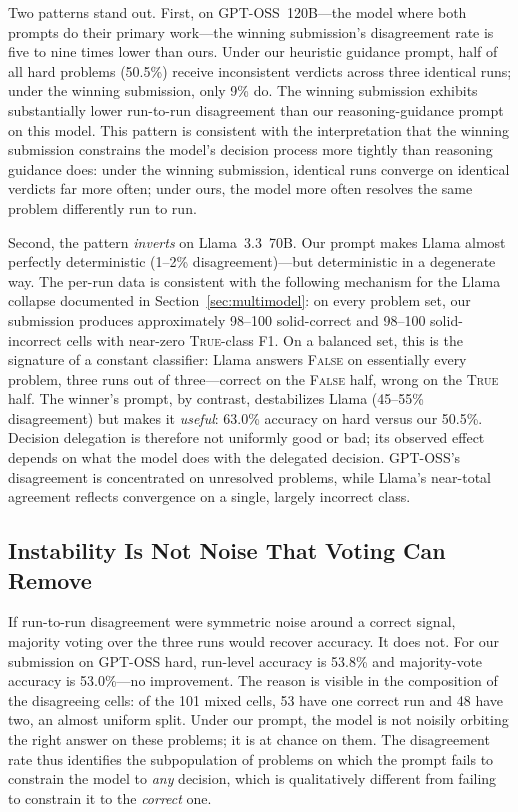 \documentclass[11pt]{article}
\begin{document}
Two patterns stand out. First, on GPT-OSS~120B---the model where both
prompts do their primary work---the winning submission's disagreement
rate is five to nine times lower than ours. Under our heuristic
guidance prompt, half of all hard problems (50.5\%) receive
inconsistent verdicts across three identical runs; under the winning
submission, only 9\% do. The winning submission exhibits
substantially lower run-to-run disagreement than our
reasoning-guidance prompt on this model. This pattern is consistent
with the interpretation that the winning submission constrains the
model's decision process more tightly than reasoning guidance does:
under the winning submission, identical runs converge on identical
verdicts far more often; under ours, the model more often resolves
the same problem differently run to run.

Second, the pattern \emph{inverts} on Llama~3.3~70B. Our prompt makes
Llama almost perfectly deterministic (1--2\% disagreement)---but
deterministic in a degenerate way. The per-run data is consistent with the following
mechanism for the Llama collapse documented in
Section~\ref{sec:multimodel}: on every problem set, our submission
produces approximately 98--100 solid-correct and 98--100 solid-incorrect
cells with near-zero \textsc{True}-class F1. On a balanced set, this is
the signature of a constant classifier: Llama answers \textsc{False}
on essentially every problem, three runs out of three---correct on the
\textsc{False} half, wrong on the \textsc{True} half. The winner's
prompt, by contrast, destabilizes Llama (45--55\% disagreement) but
makes it \emph{useful}: 63.0\% accuracy on hard versus our 50.5\%.
Decision delegation is therefore not uniformly good or bad; its
observed effect depends on what the model does with the delegated
decision. GPT-OSS's disagreement is concentrated on unresolved
problems, while Llama's near-total agreement reflects convergence on a
single, largely incorrect class.

\subsection{Instability Is Not Noise That Voting Can Remove}
\label{sec:instability-voting}

If run-to-run disagreement were symmetric noise around a correct
signal, majority voting over the three runs would recover accuracy.
It does not. For our submission on GPT-OSS hard, run-level accuracy is
53.8\% and majority-vote accuracy is 53.0\%---no improvement. The
reason is visible in the composition of the disagreeing cells: of the
101 mixed cells, 53 have one correct run and 48 have two, an almost
uniform split. Under our prompt, the model is not noisily orbiting the
right answer on these problems; it is at chance on them. The
disagreement rate thus identifies the subpopulation of problems on
which the prompt fails to constrain the model to \emph{any} decision,
which is qualitatively different from failing to constrain it to the
\emph{correct} one.
\end{document}
